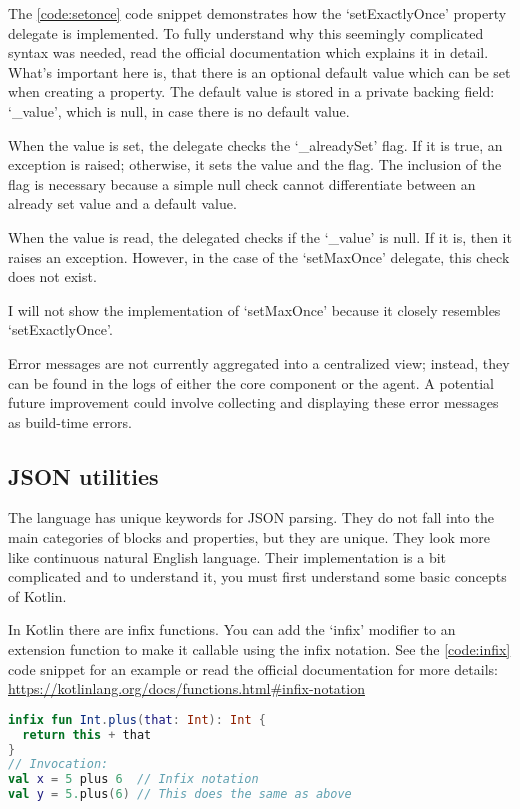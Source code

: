 The \ref{code:setonce} code snippet demonstrates how the `setExactlyOnce' property delegate is implemented. To fully understand why this seemingly complicated syntax was needed, read the official documentation which explains it in detail. What's important here is, that there is an optional default value which can be set when creating a property. The default value is stored in a private backing field: `\_value', which is null, in case there is no default value. 

When the value is set, the delegate checks the `\_alreadySet' flag. If it is true, an exception is raised; otherwise, it sets the value and the flag. The inclusion of the flag is necessary because a simple null check cannot differentiate between an already set value and a default value.

When the value is read, the delegated checks if the `\_value' is null. If it is, then it raises an exception. However, in the case of the `setMaxOnce' delegate, this check does not exist.

I will not show the implementation of `setMaxOnce' because it closely resembles `setExactlyOnce'.

Error messages are not currently aggregated into a centralized view; instead, they can be found in the logs of either the core component or the agent. A potential future improvement could involve collecting and displaying these error messages as build-time errors.

\subsection{JSON utilities}

The language has unique keywords for JSON parsing. They do not fall into the main categories of blocks and properties, but they are unique. They look more like continuous natural English language. Their implementation is a bit complicated and to understand it, you must first understand some basic concepts of Kotlin.

In Kotlin there are infix functions. You can add the `infix' modifier to an extension function to make it callable using the infix notation. See the \ref{code:infix} code snippet for an example or read the official documentation for more details: \url{https://kotlinlang.org/docs/functions.html#infix-notation}

\begin{lstlisting}[caption={Infix functions},language=Kotlin,label=code:infix]
infix fun Int.plus(that: Int): Int {
  return this + that
}
// Invocation:
val x = 5 plus 6  // Infix notation
val y = 5.plus(6) // This does the same as above
\end{lstlisting}

